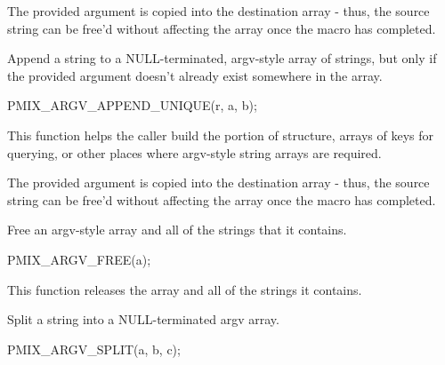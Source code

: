 \adviceuserstart
The provided argument is copied into the destination array - thus, the source string can be free'd without affecting the array once the macro has completed.
\adviceuserend


Append a string to a NULL-terminated, argv-style array of strings, but only if the provided argument doesn't already exist somewhere in the array.

\cspecificstart
\begin{codepar}
PMIX_ARGV_APPEND_UNIQUE(r, a, b);
\end{codepar}
\cspecificend

\begin{arglist}
\end{arglist}

This function helps the caller build the  portion of  structure, arrays of keys for querying, or other places where argv-style string arrays are required.

\adviceuserstart
The provided argument is copied into the destination array - thus, the source string can be free'd without affecting the array once the macro has completed.
\adviceuserend


Free an argv-style array and all of the strings that it contains.

\cspecificstart
\begin{codepar}
PMIX_ARGV_FREE(a);
\end{codepar}
\cspecificend

\begin{arglist}
\end{arglist}

This function releases the array and all of the strings it contains.


Split a string into a NULL-terminated argv array.

\cspecificstart
\begin{codepar}
PMIX_ARGV_SPLIT(a, b, c);
\end{codepar}
\cspecificend

